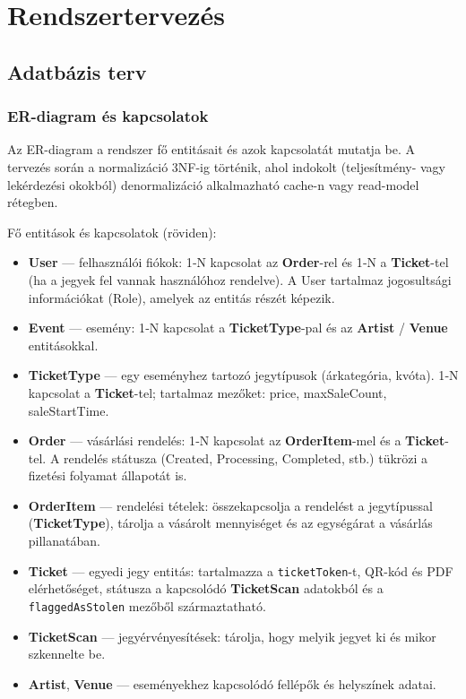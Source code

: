 \documentclass[colorlinks]{docs}
\theoremstyle{definition}
\theoremstyle{remark}
\begin{document}
\chapter{Rendszertervezés}
\section{Adatbázis terv}
\subsection{ER-diagram és kapcsolatok}
Az ER-diagram a rendszer fő entitásait és azok kapcsolatát mutatja be. A tervezés során a normalizáció 3NF-ig történik, ahol indokolt (teljesítmény- vagy lekérdezési okokból) denormalizáció alkalmazható cache-n vagy read-model rétegben.

Fő entitások és kapcsolatok (röviden):
\begin{itemize}
    \item \textbf{User} — felhasználói fiókok: 1‑N kapcsolat az \textbf{Order}-rel és 1‑N a \textbf{Ticket}-tel (ha a jegyek fel vannak használóhoz rendelve). A User tartalmaz jogosultsági információkat (Role), amelyek az entitás részét képezik.
    \item \textbf{Event} — esemény: 1‑N kapcsolat a \textbf{TicketType}-pal és az \textbf{Artist} / \textbf{Venue} entitásokkal.
    \item \textbf{TicketType} — egy eseményhez tartozó jegytípusok (árkategória, kvóta). 1‑N kapcsolat a \textbf{Ticket}-tel; tartalmaz mezőket: price, maxSaleCount, saleStartTime.
    \item \textbf{Order} — vásárlási rendelés: 1‑N kapcsolat az \textbf{OrderItem}-mel és a \textbf{Ticket}-tel. A rendelés státusza (Created, Processing, Completed, stb.) tükrözi a fizetési folyamat állapotát is.
    \item \textbf{OrderItem} — rendelési tételek: összekapcsolja a rendelést a jegytípussal (\textbf{TicketType}), tárolja a vásárolt mennyiséget és az egységárat a vásárlás pillanatában.
    \item \textbf{Ticket} — egyedi jegy entitás: tartalmazza a \texttt{ticketToken}-t, QR-kód és PDF elérhetőséget, státusza a kapcsolódó \textbf{TicketScan} adatokból és a \texttt{flaggedAsStolen} mezőből származtatható.
    \item \textbf{TicketScan} — jegyérvényesítések: tárolja, hogy melyik jegyet ki és mikor szkennelte be.
    \item \textbf{Artist}, \textbf{Venue} — eseményekhez kapcsolódó fellépők és helyszínek adatai.
\end{itemize}
\end{document}
